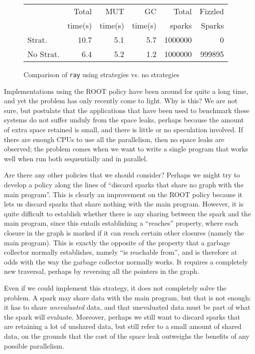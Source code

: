 \documentclass[twocolumn,9pt]{sigplanconf}
\begin{document}
\begin{figure}
\begin{tabular}{l|rrrrr}
              &  Total    & MUT     & GC      & Total  & Fizzled \\
              &  time(s)  & time(s) & time(s) & sparks & Sparks \\
\hline
Strat.    &   10.7 &  5.1 & 5.7 & 1000000 & 0 \\
No Strat. &    6.4 &  5.2 & 1.2 & 1000000 & 999895\\
\end{tabular}
\caption{Comparison of \texttt{ray} using strategies vs. no strategies}
\label{f:par-space-leak}
\end{figure}

Implementations using the ROOT policy have been around for quite a
long time, and yet the problem has only recently come to light.  Why
is this?  We are not sure, but postulate that the applications that
have been used to benchmark these systems do not suffer unduly from
the space leaks, perhaps because the amount of extra space retained is
small, and there is little or no speculation involved.  If there are
enough CPUs to use all the parallelism, then no space leaks are
observed; the problem comes when we want to write a single program
that works well when run both sequentially and in parallel.

Are there any other policies that we should consider?  Perhaps
we might try to develop a policy along the lines of ``discard sparks
that share no graph with the main program''.  This is clearly an
improvement on the ROOT policy because it lets us discard sparks that
share nothing with the main program.  However, it is quite difficult
to establish whether there is any sharing between the spark and the
main program, since this entails establishing a ``reaches'' property,
where each closure in the graph is marked if it can reach certain
other closures (namely the main program).  This is exactly the
opposite of the property that a garbage collector normally
establishes, namely ``is reachable from'', and is therefore at odds
with the way the garbage collector normally works.  It requires a
completely new traversal, perhaps by reversing all the pointers in the
graph.

Even if we could implement this strategy, it does not completely solve
the problem.  A spark may share data with the main program, but that
is not enough: it has to share \emph{unevaluated} data, and that
unevaluated data must be part of what the spark will evaluate.
Moreover, perhaps we still want to discard sparks that are retaining a
lot of unshared data, but still refer to a small amount of shared
data, on the grounds that the cost of the space leak outweighs the
benefits of any possible parallelism.
\end{document}
